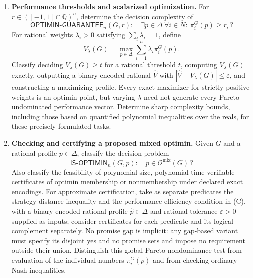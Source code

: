 \documentclass[11pt,a4paper]{article}
\begin{document}
\begin{enumerate}[label=\textbf{(\Alph*)},leftmargin=2.7em]
\item \textbf{Performance thresholds and scalarized optimization.}
For $r\in([-1,1]\cap\mathbb Q)^n$, determine the decision complexity of
\[
\mathsf{OPTIMIN\text{-}GUARANTEE}_n(G,r):\quad
\exists p\in\Delta\ \forall i\in N:\ \pi_i^G(p)\ge r_i\,?
\]
For rational weights $\lambda_i>0$ satisfying $\sum_i\lambda_i=1$, define
\[
V_\lambda(G)=\max_{p\in\Delta}\sum_{i=1}^n\lambda_i\pi_i^G(p).
\]
Classify deciding $V_\lambda(G)\ge t$ for a rational threshold $t$, computing $V_\lambda(G)$ exactly, outputting a binary-encoded rational $\widehat V$ with $|\widehat V-V_\lambda(G)|\le\varepsilon$, and constructing a maximizing profile. Every exact maximizer for strictly positive weights is an optimin point, but varying $\lambda$ need not generate every Pareto-undominated performance vector. Determine sharp complexity bounds, including those based on quantified polynomial inequalities over the reals, for these precisely formulated tasks.

\item \textbf{Checking and certifying a proposed mixed optimin.}
Given $G$ and a rational profile $p\in\Delta$, classify the decision problem
\[
\mathsf{IS\text{-}OPTIMIN}_n(G,p):\quad p\in\mathcal O^{\mathrm{mix}}(G)\,?
\]
Also classify the feasibility of polynomial-size, polynomial-time-verifiable certificates of optimin membership or nonmembership under declared exact encodings. For approximate certification, take as separate predicates the strategy-distance inequality and the performance-efficiency condition in (C), with a binary-encoded rational profile $\widehat p\in\Delta$ and rational tolerance $\varepsilon>0$ supplied as inputs; consider certificates for each predicate and its logical complement separately. No promise gap is implicit: any gap-based variant must specify its disjoint yes and no promise sets and impose no requirement outside their union. Distinguish this global Pareto-nondominance test from evaluation of the individual numbers $\pi_i^G(p)$ and from checking ordinary Nash inequalities.


\end{enumerate}
\end{document}
